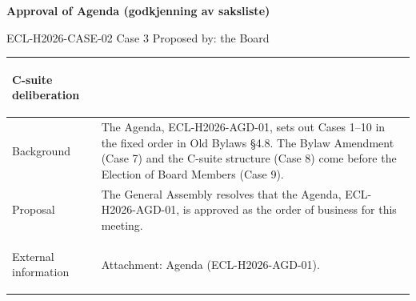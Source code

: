 \documentclass{../../../Common/Latex/Templates/rapport}
\begin{document}
\reportmainmatter
\small
\setlength{\parindent}{0pt}
\setlength{\tabcolsep}{6pt}
\renewcommand{\arraystretch}{1.2}

\begin{center}
  {\Large\bfseries Approval of Agenda (godkjenning av saksliste)}\par
  \vspace{0.15cm}
  {\normalsize ECL-H2026-CASE-02 \textperiodcentered{} Case 3 \textperiodcentered{} Proposed by: the Board}\par
  \vspace{0.1cm}
  {\small \meetingline}\par
\end{center}

\vspace{0.3cm}
\begin{tabularx}{\textwidth}{|>{\bfseries\raggedright\arraybackslash}p{4.2cm}|X|}
  \hline
  C-suite deliberation & \rule{0pt}{4.1cm} \\
  \hline
  Background           & The Agenda, ECL-H2026-AGD-01, sets out Cases 1--10 in the fixed order in Old Bylaws \S4.8. The Bylaw Amendment (Case 7) and the C-suite structure (Case 8) come before the Election of Board Members (Case 9). \\
  \hline
  Proposal             & The General Assembly resolves that the Agenda, ECL-H2026-AGD-01, is approved as the order of business for this meeting. \\
  \hline
  External information & Attachment: Agenda (ECL-H2026-AGD-01). \\
  \hline
\end{tabularx}
\end{document}
